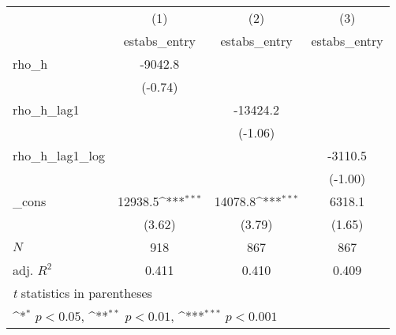 {
\def\sym#1{\ifmmode^{#1}\else\(^{#1}\)\fi}
\begin{tabular}{l*{3}{c}}
\toprule
            &\multicolumn{1}{c}{(1)}&\multicolumn{1}{c}{(2)}&\multicolumn{1}{c}{(3)}\\
            &\multicolumn{1}{c}{estabs\_entry}&\multicolumn{1}{c}{estabs\_entry}&\multicolumn{1}{c}{estabs\_entry}\\
\midrule
rho\_h       &     -9042.8         &                     &                     \\
            &     (-0.74)         &                     &                     \\
\addlinespace
rho\_h\_lag1  &                     &    -13424.2         &                     \\
            &                     &     (-1.06)         &                     \\
\addlinespace
rho\_h\_lag1\_log&                     &                     &     -3110.5         \\
            &                     &                     &     (-1.00)         \\
\addlinespace
\_cons      &     12938.5\sym{***}&     14078.8\sym{***}&      6318.1         \\
            &      (3.62)         &      (3.79)         &      (1.65)         \\
\midrule
\(N\)       &         918         &         867         &         867         \\
adj. \(R^{2}\)&       0.411         &       0.410         &       0.409         \\
\bottomrule
\multicolumn{4}{l}{\footnotesize \textit{t} statistics in parentheses}\\
\multicolumn{4}{l}{\footnotesize \sym{*} \(p<0.05\), \sym{**} \(p<0.01\), \sym{***} \(p<0.001\)}\\
\end{tabular}
}
